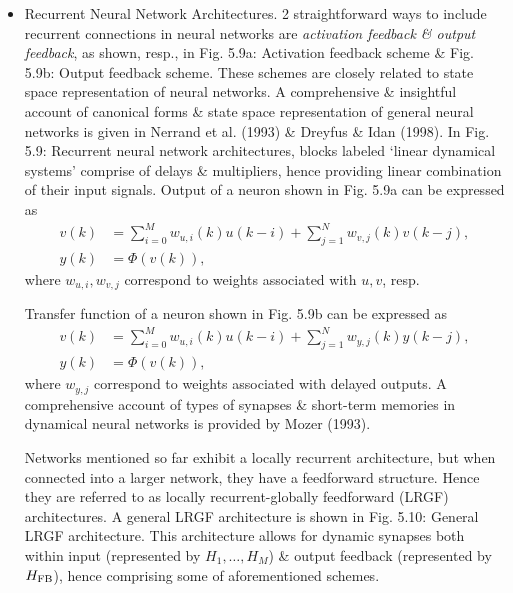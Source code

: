 \documentclass{article}
\newtheorem{example}{Example}
\begin{document}
\begin{enumerate}
\begin{itemize}
\begin{itemize}
\begin{itemize}
				\begin{example}
					Wiener model
					\begin{align}
						w(k) &= 0.8w(k - 1) + 0.4u(k - 1),\\
						y(k) &= w(k) + w^3(k) + e(k),
					\end{align}
					was identified as [complicated (5.25)] which is a NARMA model, \& hence can be realized by a recurrent neural network.
				\end{example}
			\end{itemize}
			\item {\sf Recurrent Neural Network Architectures.} 2 straightforward ways to include recurrent connections in neural networks are {\it activation feedback \& output feedback}, as shown, resp., in Fig. 5.9a: {\sf Activation feedback scheme} \& {\sf Fig. 5.9b: Output feedback scheme}. These schemes are closely related to state space representation of neural networks. A comprehensive \& insightful account of canonical forms \& state space representation of general neural networks is given in Nerrand et al. (1993) \& Dreyfus \& Idan (1998). In {\sf Fig. 5.9: Recurrent neural network architectures}, blocks labeled `linear dynamical systems' comprise of delays \& multipliers, hence providing linear combination of their input signals. Output of a neuron shown in Fig. 5.9a can be expressed as
			\begin{align}
				v(k) &= \sum_{i=0}^M w_{u,i}(k)u(k - i) + \sum_{j=1}^N w_{v,j}(k)v(k - j),\\
				y(k) &= \Phi(v(k)),
			\end{align}
			where $w_{u,i},w_{v,j}$ correspond to weights associated with $u,v$, resp.
			
			Transfer function of a neuron shown in Fig. 5.9b can be expressed as
			\begin{align}
				v(k) &= \sum_{i=0}^M w_{u,i}(k)u(k - i) + \sum_{j=1}^N w_{y,j}(k)y(k - j),\\
				y(k) &= \Phi(v(k)),
			\end{align}
			where $w_{y,j}$ correspond to weights associated with delayed outputs. A comprehensive account of types of synapses \& short-term memories in dynamical neural networks is provided by Mozer (1993).
			
			Networks mentioned so far exhibit a locally recurrent architecture, but when connected into a larger network, they have a feedforward structure. Hence they are referred to as locally recurrent-globally feedforward (LRGF) architectures. A general LRGF architecture is shown in {\sf Fig. 5.10: General LRGF architecture}. This architecture allows for dynamic synapses both within input (represented by $H_1,\ldots,H_M$) \& output feedback (represented by $H_{\rm FB}$), hence comprising some of aforementioned schemes.
			

\end{itemize}
\end{itemize}
\end{enumerate}
\end{document}

